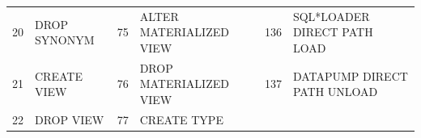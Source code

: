 \begin{appendix}
\begin{longtable}[]{@{}rl|rl|rl@{}}
\begin{minipage}[t]{0.06\columnwidth}
20\strut
\end{minipage} & \begin{minipage}[t]{0.19\columnwidth}\raggedright\strut
DROP SYNONYM\strut
\end{minipage} & \begin{minipage}[t]{0.06\columnwidth}\raggedright\strut
75\strut
\end{minipage} & \begin{minipage}[t]{0.24\columnwidth}\raggedright\strut
ALTER MATERIALIZED VIEW\strut
\end{minipage} & \begin{minipage}[t]{0.06\columnwidth}\raggedright\strut
136\strut
\end{minipage} & \begin{minipage}[t]{0.24\columnwidth}\raggedright\strut
SQL*LOADER DIRECT PATH LOAD\strut
\end{minipage}\tabularnewline
\begin{minipage}[t]{0.06\columnwidth}\raggedright\strut
21\strut
\end{minipage} & \begin{minipage}[t]{0.19\columnwidth}\raggedright\strut
CREATE VIEW\strut
\end{minipage} & \begin{minipage}[t]{0.06\columnwidth}\raggedright\strut
76\strut
\end{minipage} & \begin{minipage}[t]{0.24\columnwidth}\raggedright\strut
DROP MATERIALIZED VIEW\strut
\end{minipage} & \begin{minipage}[t]{0.06\columnwidth}\raggedright\strut
137\strut
\end{minipage} & \begin{minipage}[t]{0.24\columnwidth}\raggedright\strut
DATAPUMP DIRECT PATH UNLOAD\strut
\end{minipage}\tabularnewline
\begin{minipage}[t]{0.06\columnwidth}\raggedright\strut
22\strut
\end{minipage} & \begin{minipage}[t]{0.19\columnwidth}\raggedright\strut
DROP VIEW\strut
\end{minipage} & \begin{minipage}[t]{0.06\columnwidth}\raggedright\strut
77\strut
\end{minipage} & \begin{minipage}[t]{0.24\columnwidth}\raggedright\strut
CREATE TYPE\strut
\end{minipage} & \begin{minipage}[t]{0.06\columnwidth}\raggedright\strut

\end{minipage}
\end{longtable}
\end{appendix}
